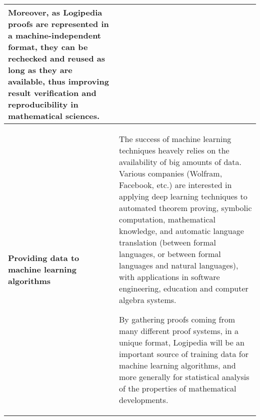 \begin{longtable}{|p{}|p{}|}
\hspace{0.4cm}
Moreover, as Logipedia proofs are represented in a machine-independent
format, they can be rechecked and reused as long as they are available,
thus improving result verification and reproducibility in mathematical
sciences.
\\
\hline
{\bf Providing data to machine learning algorithms}
&
The success of machine learning techniques heavely relies on the
availability of big amounts of data. Various companies (Wolfram,
Facebook, etc.) are interested in applying deep learning techniques to
automated theorem proving, symbolic computation, mathematical
knowledge, and automatic language translation (between formal
languages, or between formal languages and natural languages), with
applications in software engineering, education and computer algebra
systems.

\hspace{0.4cm}
By gathering proofs coming from many different proof systems, in a
unique format, Logipedia will be an important source of training data for
machine learning algorithms, and more generally for
statistical analysis of the properties of mathematical developments.
\\
\hline
\end{longtable}

